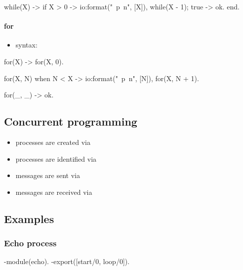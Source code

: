 \documentclass[a4paper,landscape,10pt]{article}
\begin{document}
\begin{multicols*}{2}
  \begin{erlang}
while(X) ->
  if
    X > 0 ->
      io:format("~p~n", [X]),
      while(X - 1);
    true ->
      ok.
end.
\end{erlang}

  \breakcolumn

  \paragraph{for}

  \begin{itemize}
    \item syntax: 
  \end{itemize}

  \begin{erlang}
for(X) ->
  for(X, 0).

for(X, N) when N < X ->
  io:format("~p~n", [N]),
  for(X, N + 1).

for(_, _) ->
  ok.
  \end{erlang}

  \subsection{Concurrent programming}

  \begin{itemize}
    \item processes are created via 
    \item processes are identified via 
    \item messages are sent via 
    \item messages are received via 
  \end{itemize}

  \breakcolumn

  \subsection{Examples}

  \subsubsection{Echo process}

  \begin{erlang}
-module(echo).
-export([start/0, loop/0]).


\end{erlang}
\end{multicols*}
\end{document}
